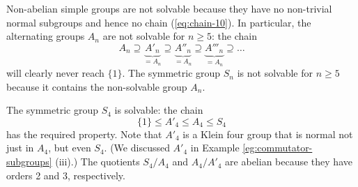 \begin{examples}
	Non-abelian simple groups are not solvable because they have no non-trivial normal subgroups and hence no chain (\ref{eq:chain-10}). In particular, the alternating groups $A_n$ are not solvable for $n \geq 5$: the chain
	\[
		A_n \supseteq \underbrace{A'_n}_{= A_n} \supseteq \underbrace{A''_n}_{= A_n} \supseteq \underbrace{A'''_n}_{= A_n} \supseteq \dots
	\]
	will clearly never reach $\{1\}$. The symmetric group $S_n$ is not solvable for $n \geq 5$ because it contains the non-solvable group $A_n$.
	
	The symmetric group $S_4$ is solvable: the chain
	\[
		\{1\} \leq A'_4 \leq A_4 \leq S_4
	\]
	has the required property. Note that $A'_4$ is a Klein four group that is normal not just in $A_4$, but even $S_4$. (We discussed $A'_4$ in Example \ref{eg:commutator-subgroups} (iii).) The quotients $S_4 / A_4$ and $A_4 / A'_4$ are abelian because they have orders 2 and 3, respectively.
\end{examples}
